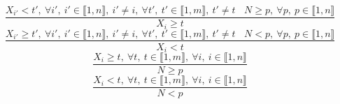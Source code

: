 $$\frac{X_{i'}<t',~\forall i',~i' \in \llbracket1,n\rrbracket,~i' \neq i,~\forall t',~t' \in \llbracket1,m\rrbracket,~t' \neq t~~~~N \geq p,~\forall p,~p \in \llbracket1,n\rrbracket}{X_{i} \geq t}$$ $$\frac{X_{i'} \geq t',~\forall i',~i' \in \llbracket1,n\rrbracket,~i' \neq i,~\forall t',~t' \in \llbracket1,m\rrbracket,~t' \neq t~~~~N<p,~\forall p,~p \in \llbracket1,n\rrbracket}{X_{i}<t}$$ $$\frac{X_{i} \geq t,~\forall t,~t \in \llbracket1,m\rrbracket,~\forall i,~i \in \llbracket1,n\rrbracket}{N \geq p}$$ $$\frac{X_{i}<t,~\forall t,~t \in \llbracket1,m\rrbracket,~\forall i,~i \in \llbracket1,n\rrbracket}{N<p}$$ 